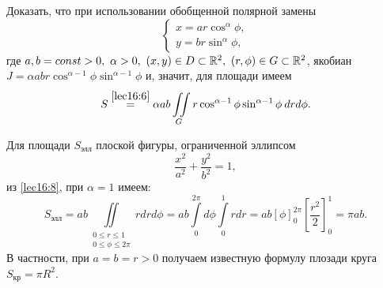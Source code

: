 \documentclass[../../main.tex]{subfiles}
\begin{document}
\begin{exercise}
	Доказать, что при использовании обобщенной полярной замены
	\begin{equation*}
	\begin{cases}
	x=ar\cos^\alpha\phi,\\
	y=br\sin^\alpha\phi,
	\end{cases}
	\end{equation*}
	где $
	a,b=const>0,\
	\alpha>0,\ (x,y)\in D \subset \mathbb{R}^2,\ (r,\phi)\in G\subset \mathbb{R}^2$,
	якобиан $J=\alpha a b r \cos^{\alpha-1}\phi\sin^{\alpha-1}\phi$ и, значит, 
	для 
	площади имеем
	\begin{equation}
	\label{lec16:8}
	S \overset{\ref{lec16:6}}{=} \alpha a b \iint\limits_G r\cos^{\alpha - 1}\phi
	\sin^{\alpha - 1}\phi \: dr d\phi.
	\end{equation}
\end{exercise}
	\begin{example}
	Для площади $S_{\text{элл}}$ плоской фигуры, ограниченной эллипсом
	\begin{equation*}
	\dfrac{x^2}{a^2} + \dfrac{y^2}{b^2} = 1,
	\end{equation*}
	из \eqref{lec16:8}, при
	$ \alpha = 1 $ имеем:
	\begin{equation*}
	S_{\text{элл}} = 
	ab\iint\limits_
	{\substack{
		0\leq r\leq1\\
		0\leq \phi \leq 2\pi
	}} rdrd \phi =
	ab \int\limits_0^{2\pi}d\phi\int\limits_0^1rdr =
	ab \left[\phi \right]^{2\pi}_0
	\left[\dfrac{r^2}{2}\right]_0^1 = \pi ab.
	\end{equation*}
	В частности, при $a = b = r > 0$ получаем известную формулу плозади круга 
	$S_{\text{кр}} = \pi R^2$.
\end{example}
\end{document}
